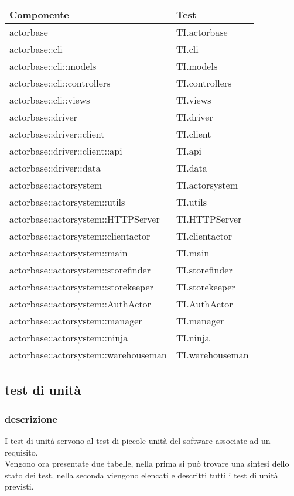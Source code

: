 \documentclass{scalatekids-article}
\begin{document}
\begin{longtable}[H]{| p{10cm} | l |}
  \hline
  Componente & Test\\
  \hline
  actorbase & TI.actorbase\\
  \hline
  actorbase::cli & TI.cli\\
  \hline
  actorbase::cli::models & TI.models\\
  \hline
  actorbase::cli::controllers & TI.controllers\\
  \hline
  actorbase::cli::views & TI.views\\
  \hline
  actorbase::driver & TI.driver\\
  \hline
  actorbase::driver::client & TI.client\\
  \hline
  actorbase::driver::client::api & TI.api\\
  \hline
  actorbase::driver::data & TI.data\\
  \hline
  actorbase::actorsystem & TI.actorsystem\\
  \hline
  actorbase::actorsystem::utils & TI.utils\\
  \hline
  actorbase::actorsystem::HTTPServer & TI.HTTPServer\\
  \hline
  actorbase::actorsystem::clientactor & TI.clientactor\\
  \hline
  actorbase::actorsystem::main & TI.main\\
  \hline
  actorbase::actorsystem::storefinder & TI.storefinder\\
  \hline
  actorbase::actorsystem::storekeeper & TI.storekeeper\\
  \hline
  actorbase::actorsystem::AuthActor & TI.AuthActor\\
  \hline
  actorbase::actorsystem::manager & TI.manager\\
  \hline
  actorbase::actorsystem::ninja & TI.ninja\\
  \hline
  actorbase::actorsystem::warehouseman & TI.warehouseman\\
  \hline
\end{longtable}

\subsection{test di unità}

\subsubsection{descrizione}

I test di unità servono al test di piccole unità del software associate ad 
un requisito.\\Vengono ora presentate due tabelle, nella prima si può trovare 
una sintesi dello stato dei test, nella seconda viengono elencati e descritti 
tutti i test di unità previsti.
\end{document}

